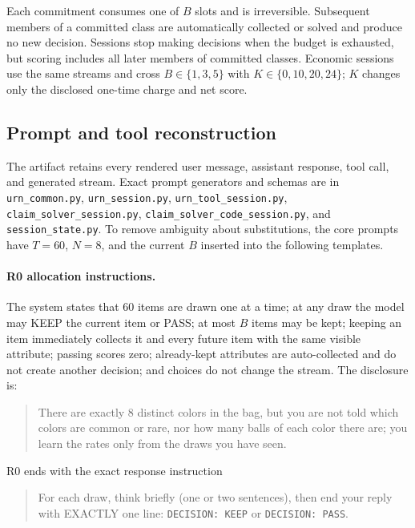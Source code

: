 \documentclass{article}
\begin{document}
Each commitment consumes one of $B$ slots and is irreversible. Subsequent members of a committed class are automatically collected or solved and produce no new decision. Sessions stop making decisions when the budget is exhausted, but scoring includes all later members of committed classes. Economic sessions use the same streams and cross $B\in\{1,3,5\}$ with $K\in\{0,10,20,24\}$; $K$ changes only the disclosed one-time charge and net score.

\subsection{Prompt and tool reconstruction}

The artifact retains every rendered user message, assistant response, tool call, and generated stream. Exact prompt generators and schemas are in \texttt{urn\_common.py}, \texttt{urn\_session.py}, \texttt{urn\_tool\_session.py}, \texttt{claim\_solver\_session.py}, \texttt{claim\_solver\_code\_session.py}, and \texttt{session\_state.py}. To remove ambiguity about substitutions, the core prompts have $T=60$, $N=8$, and the current $B$ inserted into the following templates.

\paragraph{R0 allocation instructions.} The system states that 60 items are drawn one at a time; at any draw the model may KEEP the current item or PASS; at most $B$ items may be kept; keeping an item immediately collects it and every future item with the same visible attribute; passing scores zero; already-kept attributes are auto-collected and do not create another decision; and choices do not change the stream. The disclosure is:
\begin{quote}\small
There are exactly 8 distinct colors in the bag, but you are not told which colors are common or rare, nor how many balls of each color there are; you learn the rates only from the draws you have seen.
\end{quote}
R0 ends with the exact response instruction
\begin{quote}\small
For each draw, think briefly (one or two sentences), then end your reply with EXACTLY one line: \texttt{DECISION: KEEP} or \texttt{DECISION: PASS}.
\end{quote}
\end{document}
